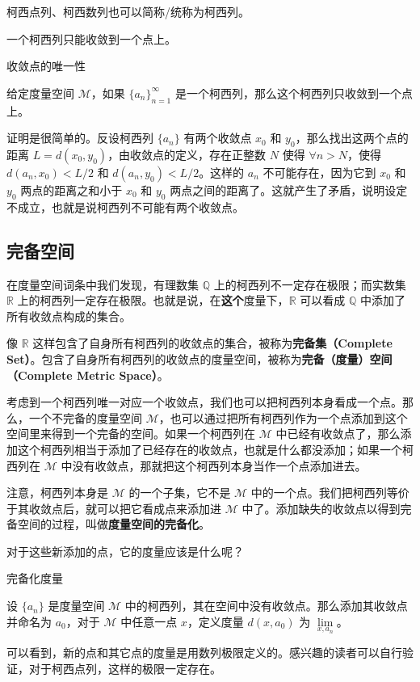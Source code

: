 柯西点列、柯西数列也可以简称/统称为柯西列。

一个柯西列只能收敛到一个点上。

\begin{theorem}{收敛点的唯一性}

给定度量空间 $\mathcal{M}$，如果 $\{a_n\}_{n=1}^{\infty}$ 是一个柯西列，那么这个柯西列只收敛到一个点上。

\end{theorem}

证明是很简单的。反设柯西列 $\{a_n\}$ 有两个收敛点 $x_0$ 和 $y_0$，那么找出这两个点的距离 $L=d(x_0, y_0)$，由收敛点的定义，存在正整数 $N$ 使得 $\forall n>N$，使得 $d(a_n, x_0)<L/2$ 和 $d(a_n, y_0)<L/2$。这样的 $a_n$ 不可能存在，因为它到 $x_0$ 和 $y_0$ 两点的距离之和小于 $x_0$ 和 $y_0$ 两点之间的距离了。这就产生了矛盾，说明设定不成立，也就是说柯西列不可能有两个收敛点。


\subsection{完备空间}

在度量空间词条中我们发现，有理数集 $\mathbb{Q}$ 上的柯西列不一定存在极限；而实数集 $\mathbb{R}$ 上的柯西列一定存在极限。也就是说，在\textbf{这个}度量下，$\mathbb{R}$ 可以看成 $\mathbb{Q}$ 中添加了所有收敛点构成的集合。

像 $\mathbb{R}$ 这样包含了自身所有柯西列的收敛点的集合，被称为\textbf{完备集（Complete Set）}。包含了自身所有柯西列的收敛点的度量空间，被称为\textbf{完备（度量）空间（Complete Metric Space）}。

考虑到一个柯西列唯一对应一个收敛点，我们也可以把柯西列本身看成一个点。那么，一个不完备的度量空间 $\mathcal{M}$，也可以通过把所有柯西列作为一个点添加到这个空间里来得到一个完备的空间。如果一个柯西列在 $\mathcal{M}$ 中已经有收敛点了，那么添加这个柯西列相当于添加了已经存在的收敛点，也就是什么都没添加；如果一个柯西列在 $\mathcal{M}$ 中没有收敛点，那就把这个柯西列本身当作一个点添加进去。

注意，柯西列本身是 $\mathcal{M}$ 的一个子集，它不是 $\mathcal{M}$ 中的一个点。我们把柯西列等价于其收敛点后，就可以把它看成点来添加进 $\mathcal{M}$ 中了。添加缺失的收敛点以得到完备空间的过程，叫做\textbf{度量空间的完备化}。

对于这些新添加的点，它的度量应该是什么呢？

\begin{definition}{完备化度量}

设 $\{a_n\}$ 是度量空间 $\mathcal{M}$ 中的柯西列，其在空间中没有收敛点。那么添加其收敛点并命名为 $a_0$，对于 $\mathcal{M}$ 中任意一点 $x$，定义度量 $d(x, a_0)$ 为 $\lim\limits_{x, a_n}$。

\end{definition}

可以看到，新的点和其它点的度量是用数列极限定义的。感兴趣的读者可以自行验证，对于柯西点列，这样的极限一定存在。